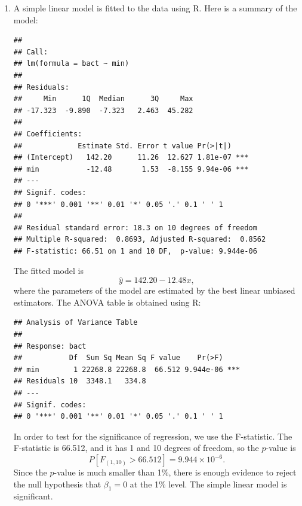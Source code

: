 \begin{solution}{2.22}
\begin{enumerate}
\item A simple linear model is fitted to the data using \textsf{R}. Here is a summary of the model:
\begin{knitrout}
\color{fgcolor}\begin{kframe}
\begin{alltt}
 \hlkwb{<-} \hlopt{~}
\end{alltt}
\begin{verbatim}
##
## Call:
## lm(formula = bact ~ min)
##
## Residuals:
##     Min      1Q  Median      3Q     Max
## -17.323  -9.890  -7.323   2.463  45.282
##
## Coefficients:
##             Estimate Std. Error t value Pr(>|t|)
## (Intercept)   142.20      11.26  12.627 1.81e-07 ***
## min           -12.48       1.53  -8.155 9.94e-06 ***
## ---
## Signif. codes:
## 0 '***' 0.001 '**' 0.01 '*' 0.05 '.' 0.1 ' ' 1
##
## Residual standard error: 18.3 on 10 degrees of freedom
## Multiple R-squared:  0.8693,	Adjusted R-squared:  0.8562
## F-statistic: 66.51 on 1 and 10 DF,  p-value: 9.944e-06
\end{verbatim}
\end{kframe}
\end{knitrout}
The fitted model is $$\hat{y}=142.20-12.48x,$$ where the parameters of the model are estimated by the best linear unbiased estimators. The ANOVA table is obtained using \textsf{R}:
\begin{knitrout}
\color{fgcolor}\begin{kframe}
\begin{alltt}
\end{alltt}
\begin{verbatim}
## Analysis of Variance Table
##
## Response: bact
##           Df  Sum Sq Mean Sq F value    Pr(>F)
## min        1 22268.8 22268.8  66.512 9.944e-06 ***
## Residuals 10  3348.1   334.8
## ---
## Signif. codes:
## 0 '***' 0.001 '**' 0.01 '*' 0.05 '.' 0.1 ' ' 1
\end{verbatim}
\end{kframe}
\end{knitrout}

In order to test for the significance of regression, we use the F-statistic. The F-statistic is 66.512, and it has 1 and 10 degrees of freedom, so the $p$-value is $$P[F_{(1,10)}>66.512]=9.944\times10^{-6} .$$ Since the $p$-value is much smaller than 1\%, there is enough evidence to reject the null hypothesis that $\beta_{1}=0$ at the 1\% level. The simple linear model is significant.


\end{enumerate}
\end{solution}
